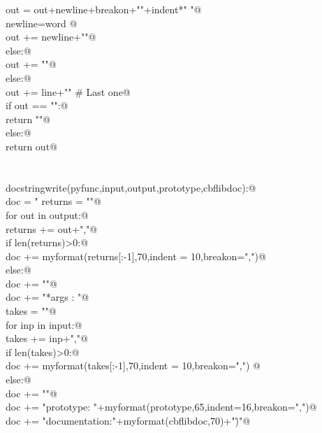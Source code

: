 \documentclass[10pt,a4paper,twoside,notitlepage]{article}
\begin{document}
\begin{flushleft}
\begin{minipage}{\linewidth}
\begin{list}{}{}
\mbox{}\verb@                  out = out+newline+breakon+"\n"+indent*" "@\\
\mbox{}\verb@                  newline=word       @\\
\mbox{}\verb@            out += newline+"\n"@\\
\mbox{}\verb@         else:@\\
\mbox{}\verb@            out += "\n"@\\
\mbox{}\verb@      else:@\\
\mbox{}\verb@         out += line+"\n" # Last one@\\
\mbox{}\verb@   if out == "":@\\
\mbox{}\verb@      return "\n"@\\
\mbox{}\verb@   else:@\\
\mbox{}\verb@      return out@\\
\mbox{}\verb@@\\
\mbox{}\verb@@\\
\mbox{}\verb@def docstringwrite(pyfunc,input,output,prototype,cbflibdoc):@\\
\mbox{}\verb@   doc = "%feature(\"autodoc\", \"\nReturns : "@\\
\mbox{}\verb@   returns = ""@\\
\mbox{}\verb@   for out in output:@\\
\mbox{}\verb@      returns += out+","@\\
\mbox{}\verb@   if len(returns)>0:@\\
\mbox{}\verb@      doc += myformat(returns[:-1],70,indent = 10,breakon=",")@\\
\mbox{}\verb@   else:@\\
\mbox{}\verb@      doc += "\n"@\\
\mbox{}\verb@   doc += "*args   : "@\\
\mbox{}\verb@   takes = ""@\\
\mbox{}\verb@   for inp in input:@\\
\mbox{}\verb@      takes += inp+","@\\
\mbox{}\verb@   if len(takes)>0:@\\
\mbox{}\verb@      doc += myformat(takes[:-1],70,indent = 10,breakon=",")   @\\
\mbox{}\verb@   else:@\\
\mbox{}\verb@      doc += "\n"@\\
\mbox{}\verb@   doc += "\nC prototype: "+myformat(prototype,65,indent=16,breakon=",")@\\
\mbox{}\verb@   doc += "\nCBFLib documentation:\n"+myformat(cbflibdoc,70)+"\")"@\\

\end{list}
\end{minipage}
\end{flushleft}
\end{document}
